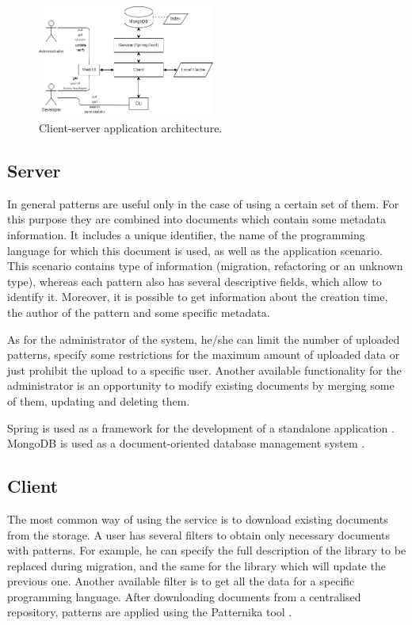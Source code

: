 \documentclass[letterpaper, 10 pt, conference]{ieeeconf}  %
\begin{document}
\begin{figure}[hbtp]
    \centerline{\includegraphics[width=0.52\textwidth]{arch}}
    \caption{Client-server application architecture.}
    \label{fig:architecture}
\end{figure}

\subsection{Server}
In general patterns are useful only in the case of using a certain set of them.
For this purpose they are combined into documents which contain some metadata
information.
It includes a unique identifier, the name of the programming language for which
this document is used, as well as the application scenario. 
This scenario contains type of information (migration, refactoring or an unknown
type), whereas each pattern also has several descriptive fields, which allow 
to identify it.
Moreover, it is possible to get information about the creation time, the author
of the pattern and some specific metadata.

As for the administrator of the system, he/she can limit the number of uploaded
patterns, specify some restrictions for the maximum amount of uploaded data 
or just prohibit the upload to a specific user. 
Another available functionality for the administrator is an opportunity to
modify existing documents by merging some of them, updating and deleting them.

Spring is used as a framework for the development of a standalone 
application \cite{c5}.
MongoDB is used as a document-oriented database management system \cite{c6}. 

\subsection{Client}
The most common way of using the service is to download existing documents 
from the storage. 
A user has several filters to obtain only necessary documents with patterns. 
For example, he can specify the full description of the library to be replaced
during migration, and the same for the library which will update the previous
one. 
Another available filter is to get all the data for a specific programming
language. 
After downloading documents from a centralised repository, patterns are 
applied using the Patternika tool \cite{c1}. 
\end{document}
